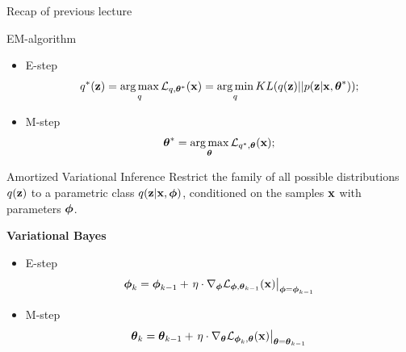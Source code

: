 \documentclass{beamer}
\begin{document}
\begin{frame}
\titlepage
\end{frame}
\begin{frame}{Recap of previous lecture}
	\begin{block}{EM-algorithm}
	\begin{itemize}
		\item E-step
		\[
			q^*(\mathbf{z}) = \operatorname*{arg\,max}_q \mathcal{L}_{q, \boldsymbol{\theta}^*}(\mathbf{x})
			= \operatorname*{arg\,min}_q KL(q(\mathbf{z}) || p(\mathbf{z} | \mathbf{x}, \boldsymbol{\theta}^*));
		\]
		\item M-step
		\[
			\boldsymbol{\theta}^* = \operatorname*{arg\,max}_{\boldsymbol{\theta}} \mathcal{L}_{q^*, \boldsymbol{\theta}}(\mathbf{x});
		\]
	\end{itemize}
	\end{block}
	\vspace{-0.5cm}
	\begin{block}{Amortized Variational Inference}
	Restrict the family of all possible distributions $q(\mathbf{z})$ to a parametric class $q(\mathbf{z}|\mathbf{x}, \boldsymbol{\phi})$, conditioned on the samples $\mathbf{x}$ with parameters $\boldsymbol{\phi}$.
	\end{block}
	
	\textbf{Variational Bayes}
	\begin{itemize}
		\item E-step
		\[
		\boldsymbol{\phi}_k = \boldsymbol{\phi}_{k-1} + \left.\eta \cdot \nabla_{\boldsymbol{\phi}} \mathcal{L}_{\boldsymbol{\phi}, \boldsymbol{\theta}_{k-1}}(\mathbf{x})\right|_{\boldsymbol{\phi}=\boldsymbol{\phi}_{k-1}}
		\]
		\item M-step
		\[
		\boldsymbol{\theta}_k = \boldsymbol{\theta}_{k-1} + \left.\eta \cdot \nabla_{\boldsymbol{\theta}} \mathcal{L}_{\boldsymbol{\phi}_k, \boldsymbol{\theta}}(\mathbf{x})\right|_{\boldsymbol{\theta}=\boldsymbol{\theta}_{k-1}}
		\]
	\end{itemize}
\end{frame}
\end{document}
